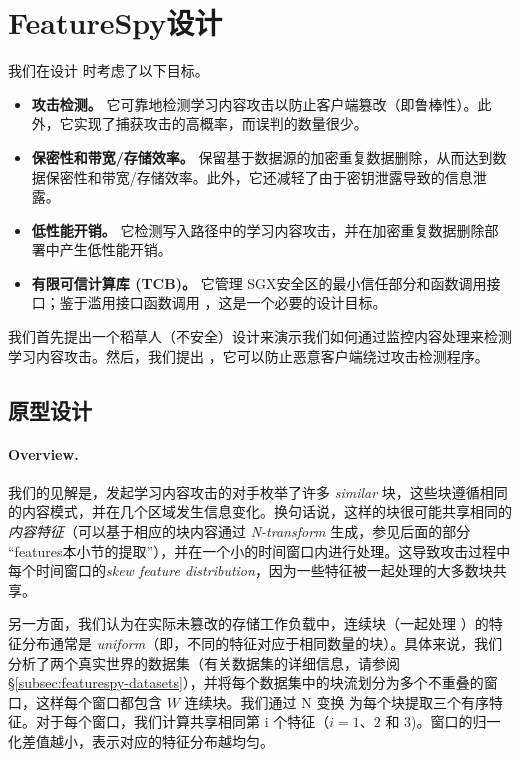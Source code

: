 \section{FeatureSpy设计}
\label{sec:featurespy-design}
我们在设计 \sysnameF 时考虑了以下目标。

\begin{itemize}[leftmargin=*]
\item {\bf 攻击检测。} 它可靠地检测学习内容攻击以防止客户端篡改（即鲁棒性）。此外，它实现了捕获攻击的高概率，而误判的数量很少。
\item {\bf 保密性和带宽/存储效率。} 保留基于数据源的加密重复数据删除，从而达到数据保密性和带宽/存储效率。此外，它还减轻了由于密钥泄露导致的信息泄露。
\item {\bf 低性能开销。} 它检测写入路径中的学习内容攻击，并在加密重复数据删除部署中产生低性能开销。
\item {\bf 有限可信计算库 (TCB)。} 它管理 SGX安全区的最小信任部分和函数调用接口；鉴于滥用接口函数调用 \cite{lie05}，这是一个必要的设计目标。
\end{itemize}

我们首先提出一个稻草人（不安全）设计来演示我们如何通过监控内容处理来检测学习内容攻击。然后，我们提出 \sysnameF，它可以防止恶意客户端绕过攻击检测程序。


\subsection{原型设计}
\label{subsec:featurespy-basic}
\paragraph*{Overview.} 我们的见解是，发起学习内容攻击的对手枚举了许多 {\em similar} 块，这些块遵循相同的内容模式，并在几个区域发生信息变化。换句话说，这样的块很可能共享相同的 {\em 内容特征}（可以基于相应的块内容通过 {\em N-transform} \cite{shilane12} 生成，参见后面的部分 “features本小节的提取”），并在一个小的时间窗口内进行处理。这导致攻击过程中每个时间窗口的{\em skew feature distribution}，因为一些特征被一起处理的大多数块共享。

另一方面，我们认为在实际未篡改的存储工作负载中，连续块（一起处理 \cite{zhu08}）的特征分布通常是 {\em uniform}（即，不同的特征对应于相同数量的块）。具体来说，我们分析了两个真实世界的数据集（有关数据集的详细信息，请参阅 \S\ref{subsec:featurespy-datasets}），并将每个数据集中的块流划分为多个不重叠的窗口，这样每个窗口都包含 $W$ 连续块。我们通过 N 变换 \cite{shilane12} 为每个块提取三个有序特征。对于每个窗口，我们计算共享相同第 i 个特征（$ i=1、2$ 和 $3$)。窗口的归一化差值越小，表示对应的特征分布越均匀。


